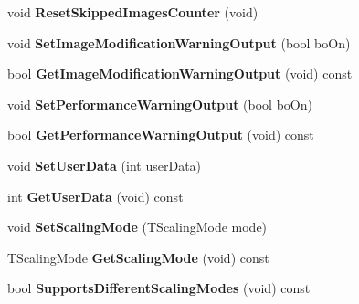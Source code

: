 \begin{DoxyCompactItemize}
\item 
\hypertarget{class_image_canvas_a4b1612e47706fcc45c0a92e26973ea2d}{void {\bfseries Reset\+Skipped\+Images\+Counter} (void)}\label{class_image_canvas_a4b1612e47706fcc45c0a92e26973ea2d}

\item 
\hypertarget{class_image_canvas_a9e286f82e991c2487531f0eedd3932a4}{void {\bfseries Set\+Image\+Modification\+Warning\+Output} (bool bo\+On)}\label{class_image_canvas_a9e286f82e991c2487531f0eedd3932a4}

\item 
\hypertarget{class_image_canvas_a4aaad632de88107fd92abd1550d1ce6d}{bool {\bfseries Get\+Image\+Modification\+Warning\+Output} (void) const }\label{class_image_canvas_a4aaad632de88107fd92abd1550d1ce6d}

\item 
\hypertarget{class_image_canvas_aeec1468b63dd42a264f45c7d622be010}{void {\bfseries Set\+Performance\+Warning\+Output} (bool bo\+On)}\label{class_image_canvas_aeec1468b63dd42a264f45c7d622be010}

\item 
\hypertarget{class_image_canvas_a57cf4003bf17c0fb344bbbcc779e2e27}{bool {\bfseries Get\+Performance\+Warning\+Output} (void) const }\label{class_image_canvas_a57cf4003bf17c0fb344bbbcc779e2e27}

\item 
\hypertarget{class_image_canvas_a5304e711bac31eef24bec975b327205f}{void {\bfseries Set\+User\+Data} (int user\+Data)}\label{class_image_canvas_a5304e711bac31eef24bec975b327205f}

\item 
\hypertarget{class_image_canvas_ad73adc33780dced2902efb8278aea01f}{int {\bfseries Get\+User\+Data} (void) const }\label{class_image_canvas_ad73adc33780dced2902efb8278aea01f}

\item 
\hypertarget{class_image_canvas_ac7f1d6d8ff6880c403e977d02f37c499}{void {\bfseries Set\+Scaling\+Mode} (T\+Scaling\+Mode mode)}\label{class_image_canvas_ac7f1d6d8ff6880c403e977d02f37c499}

\item 
\hypertarget{class_image_canvas_ac5892abe00d2638ff6651ea4c80100b1}{T\+Scaling\+Mode {\bfseries Get\+Scaling\+Mode} (void) const }\label{class_image_canvas_ac5892abe00d2638ff6651ea4c80100b1}

\item 
\hypertarget{class_image_canvas_af15b324e425a6ea86aeb177d02b43bb8}{bool {\bfseries Supports\+Different\+Scaling\+Modes} (void) const }\label{class_image_canvas_af15b324e425a6ea86aeb177d02b43bb8}

\end{DoxyCompactItemize}
